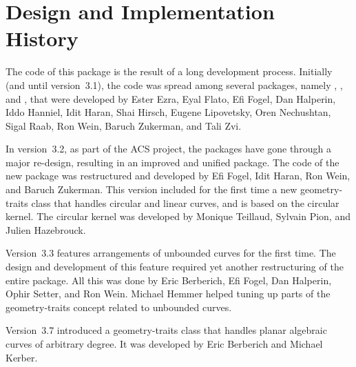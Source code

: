 \section*{Design and Implementation History}

The code of this package is the result of a long development process.
Initially (and until version~3.1), the code was spread among several
packages, namely , ,
 and , that were
developed by Ester Ezra, Eyal Flato, Efi Fogel, Dan Halperin, Iddo
Hanniel, Idit Haran, Shai Hirsch, Eugene Lipovetsky, Oren Nechushtan,
Sigal Raab, Ron Wein, Baruch Zukerman, and Tali Zvi.

In version~3.2, as part of the ACS project, the packages have gone
through a major re-design, resulting in an improved and unified
 package.
The code of the new package was restructured and developed by
Efi Fogel, Idit Haran, Ron Wein, and Baruch Zukerman. This
version included for the first time a new geometry-traits
class that handles circular and linear curves, and is based
on the circular kernel. The circular kernel was developed
by Monique Teillaud, Sylvain Pion, and Julien Hazebrouck.

Version~3.3 features arrangements of unbounded curves for the first
time. The design and development of this feature required yet another
restructuring of the entire package. All this was done by Eric
Berberich, Efi Fogel, Dan Halperin, Ophir Setter, and Ron
Wein. Michael Hemmer helped tuning up parts of the geometry-traits 
concept related to unbounded curves.

Version~3.7 introduced a geometry-traits class
that handles planar algebraic curves of arbitrary degree.
It was developed by Eric Berberich and Michael Kerber.
